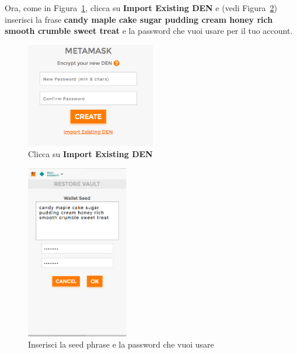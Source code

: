 Ora, come in Figura~\ref{fig:metamask2}, clicca su \textbf{Import Existing DEN} e (vedi Figura~\ref{fig:metamask3}) inserisci la frase \textbf{candy maple cake sugar pudding cream honey rich smooth crumble sweet treat} e la password che vuoi usare per il tuo account.


\begin{figure}[h]
\centering
\includegraphics[height=1.8in]{./img/importa.png}
\caption{Clicca su \textbf{Import Existing DEN}}
\label{fig:metamask2}
\end{figure}

\begin{figure}[h]
\centering
\includegraphics[height=3in]{./img/stringa_psw.png}
\caption{Inserisci la seed phrase e la password che vuoi usare}
\label{fig:metamask3}
\end{figure}
	
